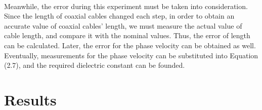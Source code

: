 \documentclass[12pt]{article}
\begin{document}
    \paragraph{}
    Meanwhile, the error during this experiment must be taken into consideration. Since the length of coaxial cables changed each step, in order to obtain an accurate value of coaxial cables' length, we must measure the actual value of cable length, and compare it with the nominal values. Thus, the error of length can be calculated. Later, the error for the phase velocity can be obtained as well. Eventually, measurements for the phase velocity can be substituted into Equation (2.7), and the required dielectric constant can be founded.
    
   
    \section{Results}
\end{document}
